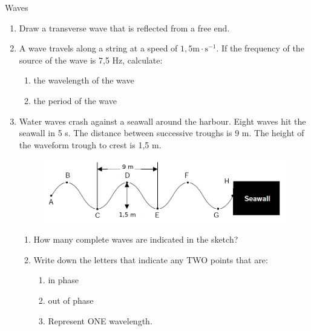 \begin{definition}
\begin{eocexercises}{Waves}
\begin{enumerate}[noitemsep, label=\textbf{\arabic*}. ]
\label{m38806*uid127}\item Draw a transverse wave that is reflected from a free end.\newline
\label{m38806*uid128}\item A wave travels along a string at a speed of $1,5\mathrm{m}\ensuremath{\cdot}\mathrm{s}{}^{-1}$. If the frequency of the source of the wave is 7,5 Hz, calculate:
\label{m38806*id324525}\begin{enumerate}[noitemsep, label=\textbf{\alph*}. ] 
            \label{m38806*uid129}\item the wavelength of the wave
\label{m38806*uid130}\item the period of the wave
\end{enumerate}
                \item Water waves crash against a seawall around the harbour. Eight waves hit the seawall in 5 s. The distance between successive troughs is 9 m. The height of the waveform trough to crest is 1,5 m. 
    \setcounter{subfigure}{0}
	\begin{figure}[H] %
    \begin{center}
    \label{m38806*id634524!!!underscore!!!media}\label{m38806*id634524!!!underscore!!!printimage}\includegraphics[width=0.8\columnwidth]{col11305.imgs/m38806_seawall.png} %
      \vspace{2pt}
    \vspace{.1in}
    \end{center}
 \end{figure}       
\label{m38806*uid081231}\begin{enumerate}[noitemsep, label=\textbf{\alph*}. ] 
            \item How many complete waves are indicated in the sketch?\item Write down the letters that indicate any TWO points that are:
\label{m38806*uid0821323}\begin{enumerate}[noitemsep, label=\textbf{\roman*}. ] 
            \item in phase\item out of phase\item Represent ONE wavelength.\end{enumerate}

\end{enumerate}
\end{enumerate}
\end{eocexercises}
\end{definition}
